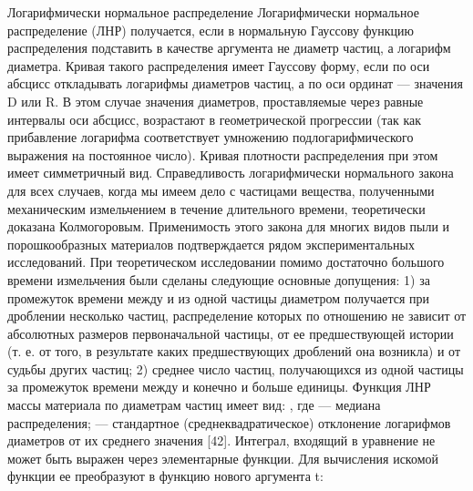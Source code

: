 Логарифмически нормальное распределение 
Логарифмически нормальное распределение (ЛНР) получается, если в нормальную Гауссову функцию распределения подставить в качестве аргумента не диаметр частиц, а логарифм диаметра. 
Кривая такого распределения имеет Гауссову форму, если по оси абсцисс откладывать логарифмы диаметров частиц, а по оси ординат — значения D или R. В этом случае значения диаметров, проставляемые через равные интервалы оси абсцисс, возрастают в геометрической прогрессии (так как прибавление логарифма соответствует умножению подлогарифмического выражения на постоянное число). Кривая плотности распределения при этом имеет симметричный вид. 
Справедливость логарифмически нормального закона для всех случаев, когда мы имеем дело с частицами вещества, полученными механическим измельчением в течение длительного времени, теоретически доказана Колмогоровым. Применимость этого закона для многих видов пыли и порошкообразных материалов подтверждается рядом экспериментальных исследований. 
При теоретическом исследовании помимо достаточно большого времени измельчения   были сделаны следующие основные допущения: 
1) за промежуток времени между   и   из одной частицы диаметром   получается при дроблении несколько частиц, распределение которых по отношению   не зависит от абсолютных размеров первоначальной частицы, от ее предшествующей истории (т. е. от того, в результате каких предшествующих дроблений она возникла) и от судьбы других частиц; 
2) среднее число частиц, получающихся из одной частицы за промежуток времени между   и   конечно и больше единицы. 
Функция ЛНР массы материала по диаметрам частиц имеет вид: 
 ,
где   — медиана распределения;   — стандартное (среднеквадратическое) отклонение логарифмов диаметров от их среднего значения [42]. 
Интеграл, входящий в уравнение не может быть выражен через элементарные функции. Для вычисления искомой функции ее преобразуют в функцию нового аргумента t: 
 
